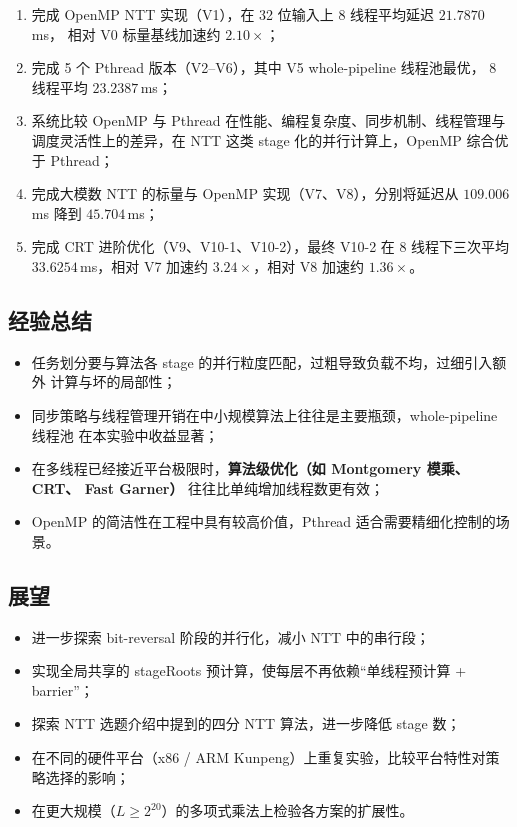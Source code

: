 \documentclass[UTF8,a4paper,10pt]{ctexart}
\begin{document}
\begin{enumerate}
  \item 完成 OpenMP NTT 实现（V1），在 32 位输入上 8 线程平均延迟 $21.7870$\,ms，
        相对 V0 标量基线加速约 $2.10\times$；
  \item 完成 5 个 Pthread 版本（V2--V6），其中 V5 whole-pipeline 线程池最优，
        8 线程平均 $23.2387$\,ms；
  \item 系统比较 OpenMP 与 Pthread 在性能、编程复杂度、同步机制、线程管理与
        调度灵活性上的差异，在 NTT 这类 stage 化的并行计算上，OpenMP 综合优于 Pthread；
  \item 完成大模数 NTT 的标量与 OpenMP 实现（V7、V8），分别将延迟从 $109.006$\,ms
        降到 $45.704$\,ms；
  \item 完成 CRT 进阶优化（V9、V10-1、V10-2），最终 V10-2 在 8 线程下三次平均
        $33.6254$\,ms，相对 V7 加速约 $3.24\times$，相对 V8 加速约 $1.36\times$。
\end{enumerate}

\subsection{经验总结}

\begin{itemize}
  \item 任务划分要与算法各 stage 的并行粒度匹配，过粗导致负载不均，过细引入额外
        计算与坏的局部性；
  \item 同步策略与线程管理开销在中小规模算法上往往是主要瓶颈，whole-pipeline 线程池
        在本实验中收益显著；
  \item 在多线程已经接近平台极限时，\textbf{算法级优化（如 Montgomery 模乘、CRT、
        Fast Garner）} 往往比单纯增加线程数更有效；
  \item OpenMP 的简洁性在工程中具有较高价值，Pthread 适合需要精细化控制的场景。
\end{itemize}

\subsection{展望}

\begin{itemize}
  \item 进一步探索 bit-reversal 阶段的并行化，减小 NTT 中的串行段；
  \item 实现全局共享的 stageRoots 预计算，使每层不再依赖``单线程预计算 + barrier''；
  \item 探索 NTT 选题介绍中提到的四分 NTT 算法，进一步降低 stage 数；
  \item 在不同的硬件平台（x86 / ARM Kunpeng）上重复实验，比较平台特性对策略选择的影响；
  \item 在更大规模（$L \ge 2^{20}$）的多项式乘法上检验各方案的扩展性。
\end{itemize}
\end{document}
